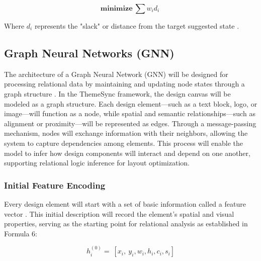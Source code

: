 \begin{refsection}
\begin{enumerate}
    \begin{center}
    \begin{minipage}{0.8\textwidth}
    \begin{equation}
    \mathbf{minimize}\ \sum w_id_i\ 
    \end{equation}
    \centering
    \end{minipage}
    \end{center}
	
	Where $d_i$ represents the "slack" or distance from the target suggested state \cite{Penco2025LLM}.
\end{enumerate}

\subsection{Graph Neural Networks (GNN)}
The architecture of a Graph Neural Network (GNN) will be designed for processing relational data by maintaining and updating node states through a graph structure \cite{Wu2022GNN}. In the ThemeSync framework, the design canvas will be modeled as a graph structure. Each design element—such as a text block, logo, or image—will function as a node, while spatial and semantic relationships—such as alignment or proximity—will be represented as edges. Through a message-passing mechanism, nodes will exchange information with their neighbors, allowing the system to capture dependencies among elements. This process will enable the model to infer how design components will interact and depend on one another, supporting relational logic inference for layout optimization.

\subsubsection{Initial Feature Encoding}
Every design element will start with a set of basic information called a feature vector \cite{Zhou2020Review}. This initial description will record the element's spatial and visual properties, serving as the starting point for relational analysis as established in Formula 6:

\begin{center}
\begin{minipage}{0.8\textwidth}
\begin{equation}
h_i^{(0)}=\ [x_i,\ y_i,w_i,h_i,c_i,s_i] 
\end{equation}
\centering
\end{minipage}
\end{center}


\end{refsection}
